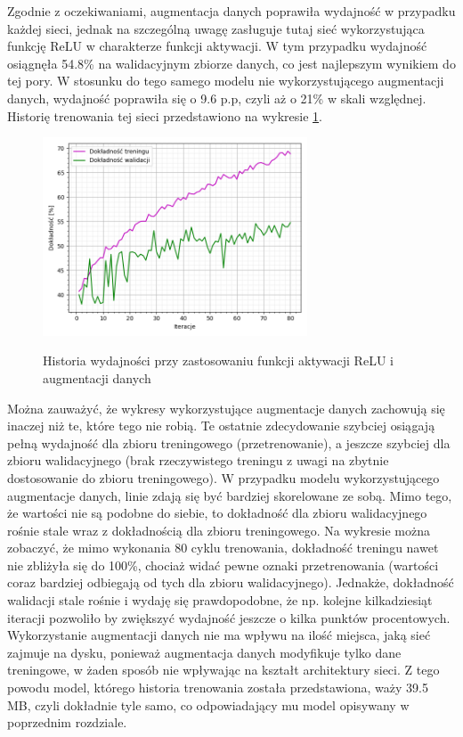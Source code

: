 Zgodnie z oczekiwaniami, augmentacja danych poprawiła wydajność w przypadku każdej sieci, jednak na szczególną uwagę zasługuje tutaj sieć wykorzystująca funkcję ReLU w charakterze funkcji aktywacji. W tym przypadku wydajność osiągnęła 54.8\% na walidacyjnym zbiorze danych, co jest najlepszym wynikiem do tej pory. W stosunku do tego samego modelu nie wykorzystującego augmentacji danych, wydajność poprawiła się o 9.6 p.p, czyli aż o 21\% w skali względnej. Historię trenowania tej sieci przedstawiono na wykresie \ref{pic:5.4}. 
\begin{figure}[H]
    \caption{Historia wydajności przy zastosowaniu funkcji aktywacji ReLU i augmentacji danych}
    \centering
    \includegraphics[width=0.7\textwidth]{wykres4.png}
    \label{pic:5.4}
\end{figure}
Można zauważyć, że wykresy wykorzystujące augmentacje danych zachowują się inaczej niż te, które tego nie robią. Te ostatnie zdecydowanie szybciej osiągają pełną wydajność dla zbioru treningowego (przetrenowanie), a jeszcze szybciej dla zbioru walidacyjnego (brak rzeczywistego treningu z uwagi na zbytnie dostosowanie do zbioru treningowego). W przypadku modelu wykorzystującego augmentacje danych, linie zdają się być bardziej skorelowane ze sobą. Mimo tego, że wartości nie są podobne do siebie, to dokładność dla zbioru walidacyjnego rośnie stale wraz z dokładnością dla zbioru treningowego. Na wykresie można zobaczyć, że mimo wykonania 80 cyklu trenowania, dokładność treningu nawet nie zbliżyła się do 100\%, chociaż widać pewne oznaki przetrenowania (wartości coraz bardziej odbiegają od tych dla zbioru walidacyjnego). Jednakże, dokładność walidacji stale rośnie i wydaję się prawdopodobne, że np. kolejne kilkadziesiąt iteracji pozwoliło by zwiększyć wydajność jeszcze o kilka punktów procentowych. Wykorzystanie augmentacji danych nie ma wpływu na ilość miejsca, jaką sieć zajmuje na dysku, ponieważ augmentacja danych modyfikuje tylko dane treningowe, w żaden sposób nie wpływając na kształt architektury sieci. Z tego powodu model, którego historia trenowania została przedstawiona, waży 39.5 MB, czyli dokładnie tyle samo, co odpowiadający mu model opisywany w poprzednim rozdziale.

